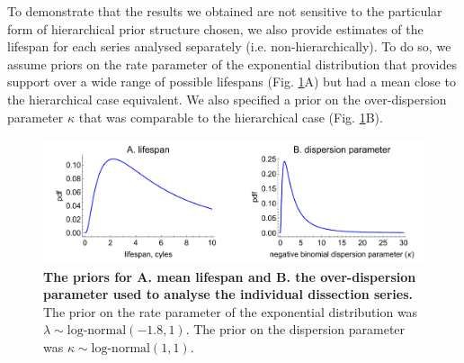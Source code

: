 \documentclass[12pt]{article}
\begin{document}
{To demonstrate that the results we obtained are not sensitive to the particular form of hierarchical prior structure chosen, we also provide estimates of the lifespan for each series analysed separately (i.e. non-hierarchically). To do so, we assume priors on the rate parameter of the exponential distribution that provides support over a wide range of possible lifespans (Fig. \ref{fig:dissection_lifespanPrior_individual}A) but had a mean close to the hierarchical case equivalent. We also specified a prior on the over-dispersion parameter $\kappa$ that was comparable to the hierarchical case (Fig. \ref{fig:dissection_lifespanPrior_individual}B).


\begin{figure}[ht]
	\centerline{\includegraphics[width=1\textwidth]{./Figure_files/dissection_lifespanPrior_individual.pdf}}
	\caption{\textbf{The priors for A. mean lifespan and B. the over-dispersion parameter used to analyse the individual dissection series.} The prior on the rate parameter of the exponential distribution was $\lambda\sim \text{log-normal}(-1.8,1)$. The prior on the dispersion parameter was $\kappa\sim \text{log-normal}(1,1)$.}\label{fig:dissection_lifespanPrior_individual}
\end{figure}

}
\end{document}
